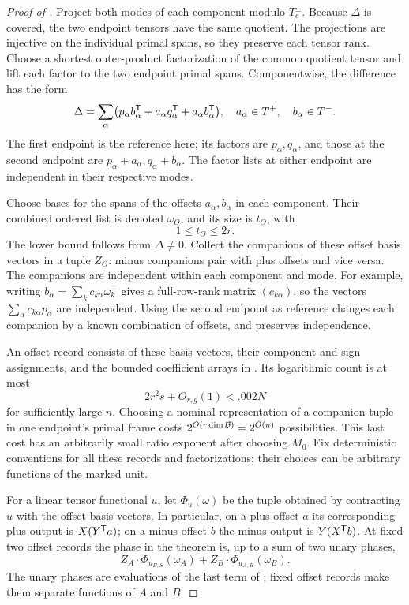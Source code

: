 \begin{proof}[Proof of ]
Project both modes of each component modulo \(T_e^\pm\).
Because \(\Delta\) is covered, the two endpoint tensors have the
same quotient.  The projections are injective on the individual
primal spans, so they preserve each tensor rank.  Choose a shortest
outer-product factorization of the common quotient tensor and
lift each factor to the two endpoint primal spans.  Componentwise,
the difference has the form
\begin{equation}
 \Delta=\sum_\alpha
   \bigl(p_\alpha b_\alpha^{\mathsf T}+
         a_\alpha q_\alpha^{\mathsf T}+
         a_\alpha b_\alpha^{\mathsf T}\bigr),
 \quad
 a_\alpha\in T^+,\quad b_\alpha\in T^- .
 \label{eq:cover-lifting}
\end{equation}
The first endpoint is the reference here; its factors are
\(p_\alpha,q_\alpha\), and those at the second endpoint are
\(p_\alpha+a_\alpha,q_\alpha+b_\alpha\).
The factor lists at either endpoint are independent in their
respective modes.

Choose bases for the spans of the offsets \(a_\alpha,b_\alpha\)
in each component.  Their combined ordered list is denoted
\(\omega_O\), and its size is \(t_O\), with
\begin{equation}
 1\le t_O\le2r.
 \label{eq:offset-rank}
\end{equation}
The lower bound follows from \(\Delta\ne0\).
Collect the companions of these offset basis vectors in a tuple
\(Z_O\): minus companions pair with plus offsets and vice versa.
The companions are independent within each component and mode.
For example, writing \(b_\alpha=\sum_kc_{k\alpha}\omega_k^-\)
gives a full-row-rank matrix \((c_{k\alpha})\), so the vectors
\(\sum_\alpha c_{k\alpha}p_\alpha\) are independent.
Using the second endpoint as reference changes each companion
by a known combination of offsets, and preserves independence.

An offset record consists of these basis vectors, their component
and sign assignments, and the bounded coefficient arrays in
.  Its logarithmic count is at most
\[
 2r^2s+O_{r,g}(1)<.002N
\]
for sufficiently large \(n\).  Choosing a nominal representation
of a companion tuple in one endpoint's primal frame costs
\(2^{O(r\dim\mathcal B)}=2^{O(n)}\) possibilities.  This last cost has
an arbitrarily small ratio exponent after choosing \(M_0\).
Fix deterministic conventions for all these records and
factorizations; their choices can be arbitrary functions of the
marked unit.

For a linear tensor functional \(u\), let \(\Phi_u(\omega)\)
be the tuple obtained by contracting \(u\) with the offset basis
vectors.  In particular, on a plus offset \(a\) its corresponding
plus output is \(X(Y^{\mathsf T} a)\); on a minus offset \(b\) the
minus output is \(Y(X^{\mathsf T} b)\).  At fixed two offset records
the phase in the theorem is, up to a sum of two unary phases,
\begin{equation}
 Z_A\cdot\Phi_{u_{B,S}}(\omega_A)
 +Z_B\cdot\Phi_{u_{A,R}}(\omega_B).
 \label{eq:offset-walsh}
\end{equation}
The unary phases are evaluations of the last term of
; fixed offset records make them separate
functions of \(A\) and \(B\).


\end{proof}
